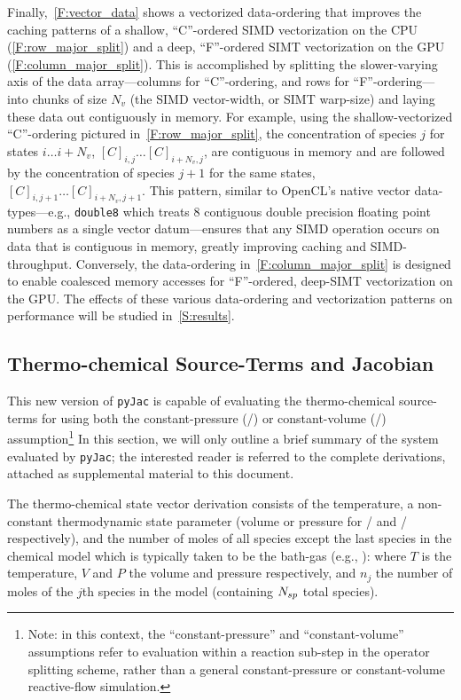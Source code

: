 \documentclass[12pt,number,sort&compress,preprint]{elsarticle}
\begin{document}
Finally,~\cref{F:vector_data} shows a vectorized data-ordering that improves the caching patterns of a shallow, ``C''-ordered SIMD vectorization on the CPU (\cref{F:row_major_split}) and a deep, ``F''-ordered SIMT vectorization on the GPU (\cref{F:column_major_split}).
This is accomplished by splitting the slower-varying axis of the data array---columns for ``C''-ordering, and rows for ``F''-ordering---into chunks of size $N_v$ (the SIMD vector-width, or SIMT warp-size) and laying these data out contiguously in memory.
For example, using the shallow-vectorized ``C''-ordering pictured in~\cref{F:row_major_split}, the concentration of species $j$ for states $i\ldots i+N_v$, $[C]_{i, j} \ldots [C]_{i + N_v, j}$, are contiguous in memory and are followed by the concentration of species $j + 1$ for the same states, $[C]_{i, j + 1} \ldots [C]_{i + N_v, j + 1}$.
This pattern, similar to OpenCL's native vector data-types---e.g., \texttt{double\num{8}} which treats \num{8} contiguous double precision floating point numbers as a single vector datum---ensures that any SIMD operation occurs on data that is contiguous in memory, greatly improving caching and SIMD-throughput.
Conversely, the data-ordering in~\cref{F:column_major_split} is designed to enable coalesced memory accesses for ``F''-ordered, deep-SIMT vectorization on the GPU.
The effects of these various data-ordering and vectorization patterns on performance will be studied in~\cref{S:results}.

\subsection{Thermo-chemical Source-Terms and Jacobian}
This new version of \texttt{pyJac} is capable of evaluating the thermo-chemical source-terms for using both the constant-pressure (\conp/) or constant-volume (\conv/) assumption\footnote{Note: in this context, the ``constant-pressure'' and ``constant-volume'' assumptions refer to evaluation within a reaction sub-step in the operator splitting scheme, rather than a general constant-pressure or constant-volume reactive-flow simulation.}
In this section, we will only outline a brief summary of the system evaluated by \texttt{pyJac}; the interested reader is referred to the complete derivations, attached as supplemental material to this document.


The thermo-chemical state vector derivation consists of the temperature, a non-constant thermodynamic state parameter (volume or pressure for \conp/ and \conv/ respectively), and the number of moles of all species except the last species in the chemical model which is typically taken to be the bath-gas (e.g., ):
where $T$ is the temperature, $V$ and $P$ the volume and pressure respectively, and $n_j$ the number of moles of the $j$th species in the model (containing $\ns/$ total species).
\end{document}
